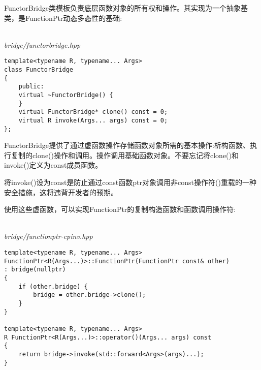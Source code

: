 FunctorBridge类模板负责底层函数对象的所有权和操作。其实现为一个抽象基类，是FunctionPtr动态多态性的基础:

\hspace*{\fill} \\ %
\noindent
\textit{bridge/functorbridge.hpp}
\begin{lstlisting}[style=styleCXX]
template<typename R, typename... Args>
class FunctorBridge
{
	public:
	virtual ~FunctorBridge() {
	}
	virtual FunctorBridge* clone() const = 0;
	virtual R invoke(Args... args) const = 0;
};
\end{lstlisting}

FunctorBridge提供了通过虚函数操作存储函数对象所需的基本操作:析构函数、执行复制的clone()操作和调用。操作调用基础函数对象。不要忘记将clone()和invoke()定义为const成员函数。

\begin{tcolorbox}[colback=webgreen!5!white,colframe=webgreen!75!black]
\hspace*{0.75cm}将invoke()设为const是防止通过const函数ptr对象调用非const操作符()重载的一种安全措施，这将违背开发者的预期。
\end{tcolorbox}

使用这些虚函数，可以实现FunctionPtr的复制构造函数和函数调用操作符:

\hspace*{\fill} \\ %
\noindent
\textit{bridge/functionptr-cpinv.hpp}
\begin{lstlisting}[style=styleCXX]
template<typename R, typename... Args>
FunctionPtr<R(Args...)>::FunctionPtr(FunctionPtr const& other)
: bridge(nullptr)
{
	if (other.bridge) {
		bridge = other.bridge->clone();
	}
}

template<typename R, typename... Args>
R FunctionPtr<R(Args...)>::operator()(Args... args) const
{
	return bridge->invoke(std::forward<Args>(args)...);
}
\end{lstlisting}














































